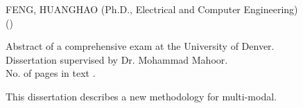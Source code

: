 \newpage
\pagestyle{empty}
\renewcommand{\baselinestretch}{1}
\begin{flushleft}
\small {
FENG, HUANGHAO  \hfill (Ph.D., Electrical and Computer Engineering)\\
\underline{} \hfill (\mydate)\\
\underline{}}

\vspace{0.25in}
Abstract of a comprehensive exam at the University of Denver.\\
\vspace{0.25in}
Dissertation supervised by Dr. Mohammad Mahoor.\\
No. of pages in text \underline{\pageref{LastPage}}.
\end{flushleft}
\renewcommand{\baselinestretch}{2}
\normalsize{This dissertation describes a new methodology for
multi-modal.}
